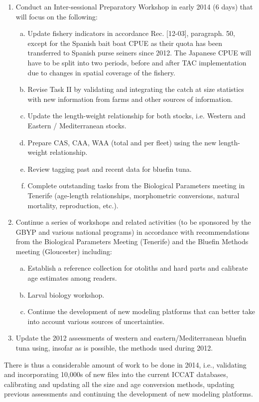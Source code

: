 \begin{enumerate}[1.]
\item Conduct an Inter-sessional Preparatory Workshop in early 2014 (6 days) that will focus on the following: 
\begin{enumerate}[a)]
\item Update fishery indicators in accordance Rec. [12-03], paragraph. 50, except for the Spanish bait boat CPUE as their quota has been transferred to Spanish purse seiners since 2012. The Japanese CPUE will have to be split into two periods, before and after TAC implementation due to changes in spatial coverage of the fishery. 
\item Revise Task II by validating and integrating the catch at size statistics with new information from farms and other sources of information. 
\item Update the length-weight relationship for both stocks, i.e. Western and Eastern / Mediterranean stocks. 
\item Prepare CAS, CAA, WAA (total and per fleet) using the new length-weight relationship. 
\item Review tagging past and recent data for bluefin tuna.
\item Complete outstanding tasks from the Biological Parameters meeting in Tenerife (age-length relationships, morphometric conversions, natural mortality, reproduction, etc.). 
\end{enumerate}
\item Continue a series of workshops and related activities (to be sponsored by the GBYP and various national programs) in accordance with recommendations from the Biological Parameters Meeting (Tenerife) and the Bluefin Methods meeting (Gloucester) including:
\begin{enumerate}[a)]
\item Establish a reference collection for otoliths and hard parts and calibrate age estimates among readers.
\item Larval biology workshop.
\item Continue the development of new modeling platforms that can better take into account various sources of uncertainties.
\end{enumerate}
\item Update the 2012 assessments of western and eastern/Mediterranean bluefin tuna using, insofar as is possible, the methods used during 2012.
\end{enumerate}


There is thus a considerable amount of work to be done in 2014, i.e., validating and incorporating 10,000s of new files into the current ICCAT databases, calibrating and updating all the size and age conversion methods, updating previous assessments and continuing the development of new modeling platforms.

